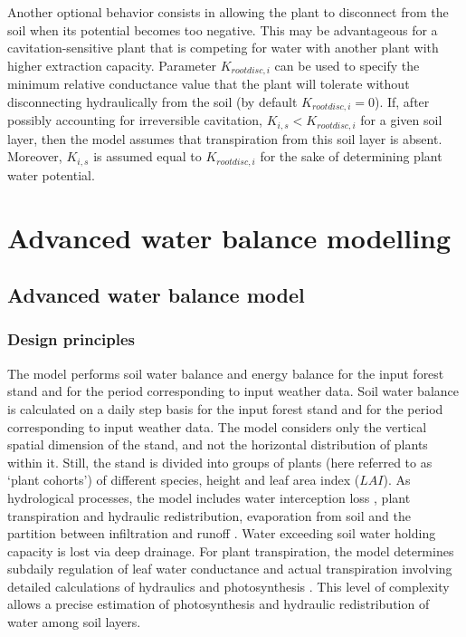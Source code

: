 \documentclass[]{book}
\begin{document}
Another optional behavior consists in allowing the plant to disconnect from the
soil when its potential becomes too negative. This may be advantageous for a
cavitation-sensitive plant that is competing for water with another plant with
higher extraction capacity. Parameter \(K_{rootdisc,i}\) can be used to specify the
minimum relative conductance value that the plant will tolerate without
disconnecting hydraulically from the soil (by default \(K_{rootdisc,i} = 0\)).
If, after possibly accounting for irreversible cavitation, \(K_{i,s}<K_{rootdisc,i}\)
for a given soil layer, then the model assumes that transpiration from this soil
layer is absent. Moreover, \(K_{i,s}\) is assumed equal to \(K_{rootdisc,i}\) for the
sake of determining plant water potential.

\hypertarget{part-advanced-water-balance-modelling}{%
\part{Advanced water balance modelling}\label{part-advanced-water-balance-modelling}}

\hypertarget{advanced-water-balance-model}{%
\chapter{Advanced water balance model}\label{advanced-water-balance-model}}

\hypertarget{design-principles-1}{%
\section{Design principles}\label{design-principles-1}}

The model performs soil water balance and energy balance for the input forest stand and for the period corresponding to input weather data. Soil water balance is calculated on a daily step basis for the input forest stand and for the period corresponding to input weather data. The model considers only the vertical spatial dimension of the stand, and not the horizontal distribution of plants within it. Still, the stand is divided into groups of plants (here referred to as `plant cohorts') of different species, height and leaf area index (\(LAI\)). As hydrological processes, the model includes water interception loss \citep{Gash1995}, plant transpiration and hydraulic redistribution, evaporation from soil \citep{Ritchie1972} and the partition between infiltration and runoff \citep{Boughton1989}. Water exceeding soil water holding capacity is lost via deep drainage. For plant transpiration, the model determines subdaily regulation of leaf water conductance and actual transpiration involving detailed calculations of hydraulics and photosynthesis \citep{Sperry2016}. This level of complexity allows a precise estimation of photosynthesis and hydraulic redistribution of water among soil layers.
\end{document}
